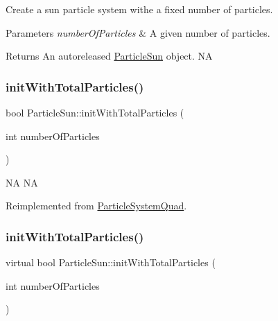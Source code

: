 Create a sun particle system withe a fixed number of particles.


\begin{DoxyParams}{Parameters}
{\em number\+Of\+Particles} & A given number of particles. \\
\hline
\end{DoxyParams}
\begin{DoxyReturn}{Returns}
An autoreleased \hyperlink{classParticleSun}{Particle\+Sun} object.  NA 
\end{DoxyReturn}
\mbox{\label{classParticleSun_a59617ff3aeed92b7e5b3fe3e823c0661}} 
\subsubsection{\texorpdfstring{init\+With\+Total\+Particles()}{initWithTotalParticles()}\hspace{0.1cm}{\footnotesize\ttfamily [1/2]}}
{\footnotesize\ttfamily bool Particle\+Sun\+::init\+With\+Total\+Particles (\begin{DoxyParamCaption}\item[{int}]{number\+Of\+Particles }\end{DoxyParamCaption})\hspace{0.3cm}{\ttfamily [virtual]}}

NA  NA 

Reimplemented from \hyperlink{classParticleSystemQuad_ae5420007b57e909c05e7476a54fbfbe9}{Particle\+System\+Quad}.

\mbox{\label{classParticleSun_a3d601303a1c2375f8ddc3e8a3306e8ae}} 
\subsubsection{\texorpdfstring{init\+With\+Total\+Particles()}{initWithTotalParticles()}\hspace{0.1cm}{\footnotesize\ttfamily [2/2]}}
{\footnotesize\ttfamily virtual bool Particle\+Sun\+::init\+With\+Total\+Particles (\begin{DoxyParamCaption}\item[{int}]{number\+Of\+Particles }\end{DoxyParamCaption})\hspace{0.3cm}{\ttfamily [virtual]}}

